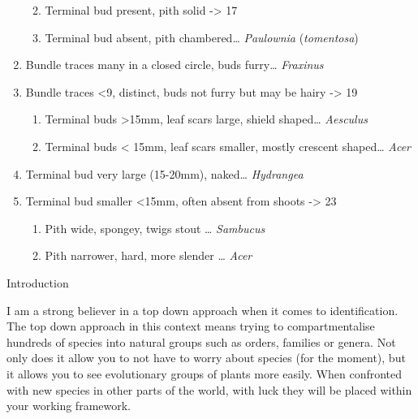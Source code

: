 \documentclass[openany]{book}
\providecommand{\tightlist}{%
  \setlength{\itemsep}{0pt}\setlength{\parskip}{0pt}}
\begin{document}
\begin{enumerate}
  \begin{enumerate}
  \def\labelenumii{\arabic{enumii}.}
  \setcounter{enumii}{14}
  \tightlist
  \item
    Terminal bud present, pith solid -\textgreater{} 17
  \item
    Terminal bud absent, pith chambered\ldots{} \emph{Paulownia}
    (\emph{tomentosa})
  \end{enumerate}
\item
  Bundle traces many in a closed circle, buds furry\ldots{}
  \emph{Fraxinus}
\item
  Bundle traces \textless{}9, distinct, buds not furry but may be hairy
  -\textgreater{} 19

  \begin{enumerate}
  \def\labelenumii{\arabic{enumii}.}
  \setcounter{enumii}{18}
  \tightlist
  \item
    Terminal buds \textgreater{}15mm, leaf scars large, shield
    shaped\ldots{} \emph{Aesculus}
  \item
    Terminal buds \textless{} 15mm, leaf scars smaller, mostly crescent
    shaped\ldots{} \emph{Acer}
  \end{enumerate}
\item
  Terminal bud very large (15-20mm), naked\ldots{} \emph{Hydrangea}
\item
  Terminal bud smaller \textless{}15mm, often absent from shoots
  -\textgreater{} 23

  \begin{enumerate}
  \def\labelenumii{\arabic{enumii}.}
  \setcounter{enumii}{22}
  \tightlist
  \item
    Pith wide, spongey, twigs stout \ldots{} \emph{Sambucus}
  \item
    Pith narrower, hard, more slender \ldots{} \emph{Acer}
  \end{enumerate}
\end{enumerate}

Introduction

I am a strong believer in a top down approach when it comes to
identification. The top down approach in this context means trying to
compartmentalise hundreds of species into natural groups such as orders,
families or genera. Not only does it allow you to not have to worry
about species (for the moment), but it allows you to see evolutionary
groups of plants more easily. When confronted with new species in other
parts of the world, with luck they will be placed within your working
framework.
\end{document}
